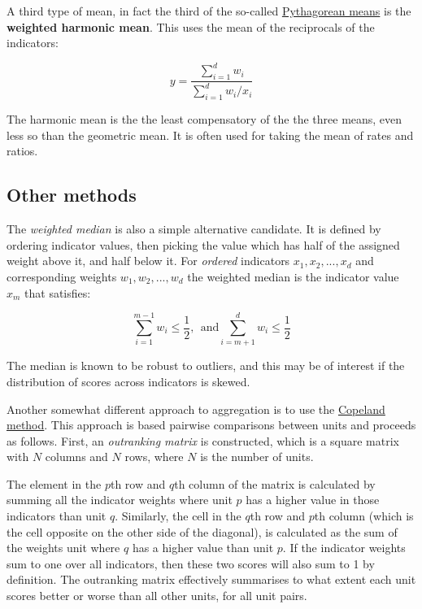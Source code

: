 \documentclass[
]{book}
\begin{document}
A third type of mean, in fact the third of the so-called \href{https://en.wikipedia.org/wiki/Pythagorean_means}{Pythagorean means} is the \textbf{weighted harmonic mean}. This uses the mean of the reciprocals of the indicators:

\[ y = \frac{\sum_{i=1}^d w_i}{\sum_{i=1}^d w_i/x_i} \]

The harmonic mean is the the least compensatory of the the three means, even less so than the geometric mean. It is often used for taking the mean of rates and ratios.

\hypertarget{other-methods}{%
\subsection{Other methods}\label{other-methods}}

The \emph{weighted median} is also a simple alternative candidate. It is defined by ordering indicator values, then picking the value which has half of the assigned weight above it, and half below it. For \emph{ordered} indicators \(x_1, x_2, ..., x_d\) and corresponding weights \(w_1, w_2, ..., w_d\) the weighted median is the indicator value \(x_m\) that satisfies:

\[ \sum_{i=1}^{m-1} w_i \leq \frac{1}{2}, \: \: \text{and} \sum_{i=m+1}^{d} w_i \leq \frac{1}{2} \]

The median is known to be robust to outliers, and this may be of interest if the distribution of scores across indicators is skewed.

Another somewhat different approach to aggregation is to use the \href{https://en.wikipedia.org/wiki/Copeland\%27s_method}{Copeland method}. This approach is based pairwise comparisons between units and proceeds as follows. First, an \emph{outranking matrix} is constructed, which is a square matrix with \(N\) columns and \(N\) rows, where \(N\) is the number of units.

The element in the \(p\)th row and \(q\)th column of the matrix is calculated by summing all the indicator weights where unit \(p\) has a higher value in those indicators than unit \(q\). Similarly, the cell in the \(q\)th row and \(p\)th column (which is the cell opposite on the other side of the diagonal), is calculated as the sum of the weights unit where \(q\) has a higher value than unit \(p\). If the indicator weights sum to one over all indicators, then these two scores will also sum to 1 by definition. The outranking matrix effectively summarises to what extent each unit scores better or worse than all other units, for all unit pairs.
\end{document}
